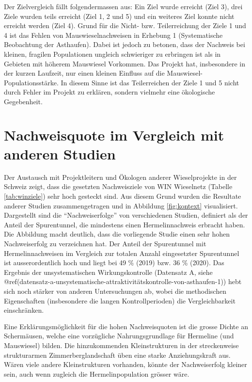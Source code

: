 \documentclass[
  oneside]{scrbook}
\begin{document}
Der Zielvergleich fällt folgendermassen aus: Ein Ziel wurde erreicht (Ziel 3), drei Ziele wurden teils erreicht (Ziel 1, 2 und 5) und ein weiteres Ziel konnte nicht erreicht werden (Ziel 4). Grund für die Nicht- bzw. Teilerreichung der Ziele 1 und 4 ist das Fehlen von Mauswieselnachweisen in Erhebung 1 (Systematische Beobachtung der Asthaufen). Dabei ist jedoch zu betonen, dass der Nachweis bei kleinen, fragilen Populationen ungleich schwieriger zu erbringen ist als in Gebieten mit höherem Mauswiesel Vorkommen. Das Projekt hat, insbesondere in der kurzen Laufzeit, nur einen kleinen Einfluss auf die Mauswiesel-Populationsstärke. In diesem Sinne ist das Teilerreichen der Ziele 1 und 5 nicht durch Fehler im Projekt zu erklären, sondern vielmehr eine ökologische Gegebenheit.

\hypertarget{nachweisquote-im-vergleich-mit-anderen-studien}{%
\section{Nachweisquote im Vergleich mit anderen Studien}\label{nachweisquote-im-vergleich-mit-anderen-studien}}

Der Austausch mit Projektleitern und Ökologen anderer Wieselprojekte in der Schweiz zeigt, dass die gesetzten Nachweisziele von WIN Wieselnetz (Tabelle \ref{tab:winziele}) sehr hoch gesteckt sind. Aus diesem Grund wurden die Resultate anderer Studien zusammengetragen und in Abbildung \ref{fig:kontext} visualisiert. Dargestellt sind die ``Nachweiserfolge'' von verschiedenen Studien, definiert als der Anteil der Spurentunnel, die mindestens einen Hermelinnachweis erbracht haben. Die Abbildung macht deutlich, dass die vorliegende Studie einen sehr hohen Nachweiserfolg zu verzeichnen hat.
Der Anteil der Spurentunnel mit Hermelinnachweisen im Vergleich zur totalen Anzahl eingesetzter Spurentunnel ist ausserordentlich hoch und liegt bei 49 \% (2019) bzw. 36 \% (2020).
Das Ergebnis der unsystematischen Wirkungskontrolle (Datensatz A, siehe @ref(datensatz-a-unsystematische-attraktivitätskontrolle-von-asthaufen-1)) hebt sich noch stärker von anderen Untersuchungen ab, wobei die methodischen Eigenschaften (insbesondere die langen Kontrollperioden) die Vergleichbarkeit einschränken.

Eine Erklärungsmöglichkeit für die hohen Nachweisquoten ist die grosse Dichte an Schermäusen, welche eine vorzügliche Nahrungsgrundlage für Hermeline (und Mauswiesel) bilden. Die hinzukommenden Kleinstrukturen in der streckenweise strukturarmen Zimmerberglandschaft üben eine starke Anziehungskraft aus. Wären viele andere Kleinstrukturen vorhanden, könnte der Nachweiserfolg kleiner sein, auch wenn zugleich die Hermelinpopulation grösser wäre.
\end{document}
